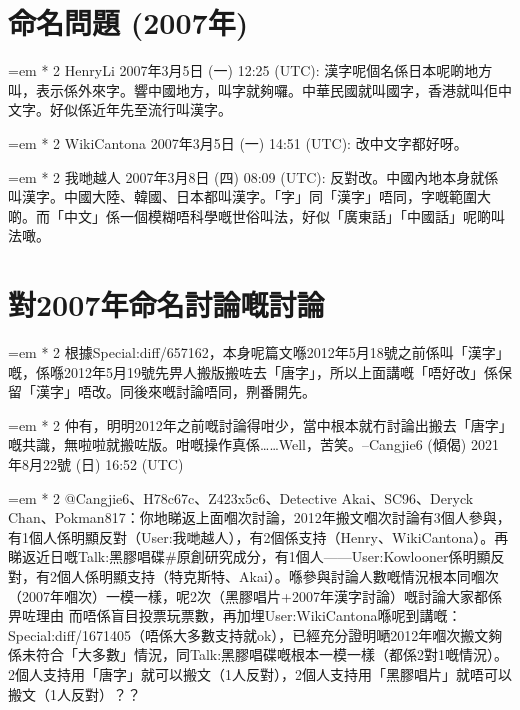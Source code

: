 
\newcommand{\ladder}[2]{%
  \par\noindent
  \begingroup
    \leftskip=\dimexpr #1em * 2\relax
    #2\par
  \endgroup
}

\section{命名問題 (2007年)}

\ladder{0}{HenryLi 2007年3月5日 (一) 12:25 (UTC):
漢字呢個名係日本呢啲地方叫，表示係外來字。響中國地方，叫字就夠囉。中華民國就叫國字，香港就叫佢中文字。好似係近年先至流行叫漢字。}

\ladder{1}{WikiCantona 2007年3月5日 (一) 14:51 (UTC):
改中文字都好呀。}

\ladder{2}{我哋越人 2007年3月8日 (四) 08:09 (UTC):
反對改。中國內地本身就係叫漢字。中國大陸、韓國、日本都叫漢字。「字」同「漢字」唔同，字嘅範圍大啲。而「中文」係一個模糊唔科學嘅世俗叫法，好似「廣東話」「中國話」呢啲叫法噉。}

\section{對2007年命名討論嘅討論}

\ladder{0}{根據Special:diff/657162，本身呢篇文喺2012年5月18號之前係叫「漢字」嘅，係喺2012年5月19號先畀人搬版搬咗去「唐字」，所以上面講嘅「唔好改」係保留「漢字」唔改。同後來嘅討論唔同，𠝹番開先。}

\ladder{0}{仲有，明明2012年之前嘅討論得咁少，當中根本就冇討論出搬去「唐字」嘅共識，無啦啦就搬咗版。咁嘅操作真係……Well，苦笑。--Cangjie6 (傾偈) 2021年8月22號 (日) 16:52 (UTC)}

\ladder{1}{@Cangjie6、H78c67c、Z423x5c6、Detective Akai、SC96、Deryck Chan、Pokman817：你地睇返上面嗰次討論，2012年搬文嗰次討論有3個人參與，有1個人係明顯反對（User:我哋越人），有2個係支持（Henry、WikiCantona）。再睇返近日嘅Talk:黑膠唱碟\#原創研究成分，有1個人——User:Kowlooner係明顯反對，有2個人係明顯支持（特克斯特、Akai）。喺參與討論人數嘅情況根本同嗰次（2007年嗰次）一模一樣，呢2次（黑膠唱片+2007年漢字討論）嘅討論大家都係畀咗理由 而唔係盲目投票玩票數，再加埋User:WikiCantona喺呢到講嘅：Special:diff/1671405（唔係大多數支持就ok），已經充分證明嗮2012年嗰次搬文夠係未符合「大多數」情況，同Talk:黑膠唱碟嘅根本一模一樣（都係2對1嘅情況）。2個人支持用「唐字」就可以搬文（1人反對），2個人支持用「黑膠唱片」就唔可以搬文（1人反對）？？}

